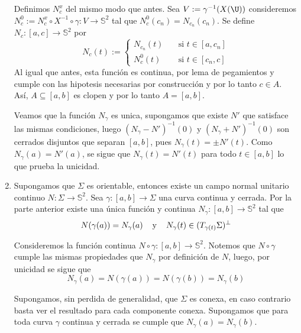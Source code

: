 \documentclass{article}
\begin{document}
\begin{enumerate}
    Definimos $N_{c}^{x}$ del mismo modo que antes. Sea $V:=\gamma^{-1}(X(\U))$ consideremos 
    $N_{c}^{0}:=N_{c}^{x}\circ X^{-1}\circ\gamma:V\to\mathbb{S}^{2}$ tal que $N_{c}^{0}(c_{n})
    =N_{c_{n}}(c_{n})$. Se define $N_{c}:[a,c]\to\mathbb{S}^{2}$ por
    \begin{equation*}
        N_{c}(t):=\begin{cases}
            N_{c_{n}}(t) &\quad\text{si }t\in[a,c_{n}] \\
            N_{c}^{0}(t) &\quad\text{si }t\in[c_{n},c]
        \end{cases}
    \end{equation*}
    Al igual que antes, esta función es continua, por lema de pegamientos y cumple con las 
    hipotesis necesarias por construcción y por lo tanto $c\in A$. Así, $A\subseteq[a,b]$ es clopen
    y por lo tanto $A=[a,b]$.

    \noindent Veamos que la función $N_{\gamma}$ es unica, supongamos que existe $N'$ que 
    satisface las mismas condiciones, luego $(N_{\gamma}-N')^{-1}(0)$ y $(N_{\gamma}+N')^{-1}(0)$
    son cerrados disjuntos que separan $[a,b]$, pues $N_{\gamma}(t)=\pm N'(t)$. Como 
    $N_{\gamma}(a)=N'(a)$, se sigue que $N_{\gamma}(t)=N'(t)$ para todo $t\in[a,b]$ lo que prueba 
    la unicidad.

    \item Supongamos que $\Sigma$ es orientable, entonces existe un campo normal unitario continuo
    $N:\Sigma\to\mathbb{S}^{2}$. Sea $\gamma:[a,b]\to\Sigma$ una curva continua y cerrada. Por la
    parte anterior existe una única función y continua $N_{\gamma}:[a,b]\to\mathbb{S}^{2}$ tal que 
    \begin{equation*}
        N(\gamma(a))=N_{\gamma}(a)\hspace{4mm}\text{y}\hspace{4mm}
        N_{\gamma}(t)\in(T_{\gamma(t)}\Sigma)^{\perp}
    \end{equation*}
    
    \vspace{2mm}
    Consideremos la función continua $N\circ\gamma:[a,b]\to\mathbb{S}^{2}$. Notemos que 
    $N\circ\gamma$ cumple las mismas propiedades que $N_{\gamma}$ por definición de $N$, luego,
    por unicidad se sigue que
    \begin{equation*}
        N_{\gamma}(a)=N(\gamma(a))=N(\gamma(b))=N_{\gamma}(b)
    \end{equation*}

    
    \noindent Supongamos, sin perdida de generalidad, que $\Sigma$ es conexa, en caso contrario 
    basta ver el resultado para cada componente conexa. Supongamos que para toda curva $\gamma$ 
    continua y cerrada se cumple que $N_{\gamma}(a)=N_{\gamma}(b)$. 
    

\end{enumerate}
\end{document}
